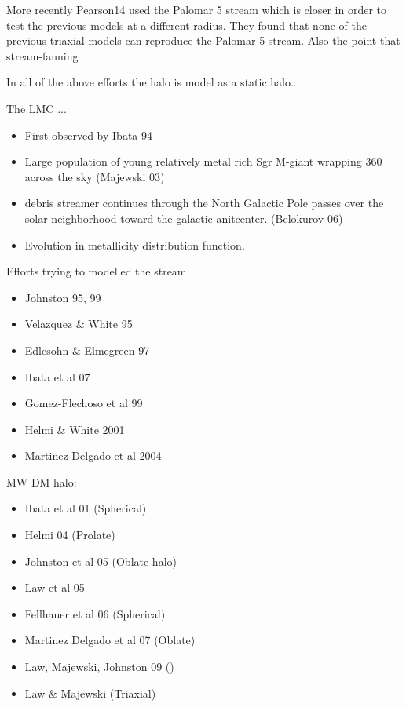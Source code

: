 \documentclass[12pt]{article}
\begin{document}
More recently Pearson14 used the Palomar 5 stream which is closer in order to test
the previous models at a different radius. They found that none of the previous
triaxial models can reproduce the Palomar 5 stream. Also the point that stream-fanning 

In all of the above efforts the halo is model as a static halo...


The LMC ...



\begin{itemize}
\item First observed by Ibata 94
\item Large population of young relatively metal rich Sgr M-giant wrapping 360
across the sky  (Majewski 03)
\item debris streamer continues through the North Galactic Pole passes over the 
solar neighborhood toward the galactic anitcenter. (Belokurov 06)
\item Evolution in metallicity distribution function.
\end{itemize}

Efforts trying to modelled the stream.

\begin{itemize}
\item Johnston 95, 99
\item Velazquez \& White 95
\item Edlesohn \& Elmegreen 97
\item Ibata et al 07
\item Gomez-Flechoso et al 99
\item Helmi \& White 2001
\item Martinez-Delgado et al 2004
\end{itemize}

MW DM halo:

\begin{itemize}
\item Ibata et al 01 (Spherical)
\item Helmi 04 (Prolate)
\item Johnston et al 05 (Oblate halo)
\item Law et al 05
\item Fellhauer et al 06 (Spherical)
\item Martinez Delgado et al 07 (Oblate)
\item Law, Majewski, Johnston 09 ()
\item Law \& Majewski (Triaxial)

\end{itemize}
\end{document}
